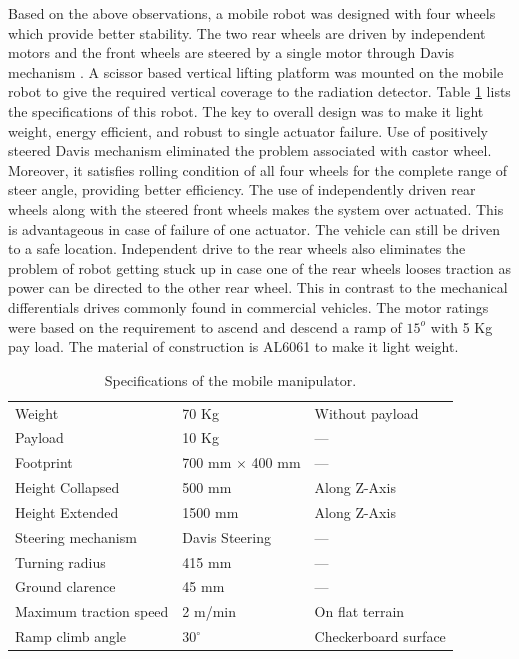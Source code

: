 \documentclass[12pt,a4paper, notitlepage]{article}
\begin{document}
	Based on the above observations, a mobile robot was designed with four wheels which provide better stability. The two rear wheels are driven by independent motors and the front wheels are steered by a single motor through Davis mechanism \cite{TOMBook}. A scissor based vertical lifting platform was mounted on the mobile robot to give the required vertical coverage to the radiation detector. Table \ref{tb:specifications} lists the  specifications of this robot. The key to overall design was to make it light weight, energy efficient, and robust to single actuator failure. Use of positively steered Davis mechanism eliminated the problem associated with castor wheel. Moreover, it satisfies rolling condition of all four wheels for the complete range of steer angle, providing better efficiency. The use of independently driven rear wheels along with the steered front  wheels makes the system over actuated. This is advantageous in case of failure of one actuator. The vehicle can still be driven to a safe location. Independent drive to the rear wheels also eliminates the problem of robot getting stuck up in case  one of the rear wheels looses traction as power can be directed to the other rear wheel. This in contrast to the mechanical differentials drives commonly found in commercial vehicles.  The motor ratings were based on the requirement to ascend and descend a ramp of $15^o$ with 5 Kg pay load. The material of construction is AL6061 to make it light weight.
	\begin{table}[!htbp]
		\caption{Specifications of the mobile manipulator.}
		\label{tb:specifications}
		\centering
		\begin{tabular}{l l l}
			\hline
			
			Weight  & 70 Kg & Without payload \\ 
			Payload & 10 Kg &---\\
			Footprint & 700 mm $\times$  400 mm & --- \\
			Height Collapsed & 500 mm  & Along  Z-Axis\\
			Height Extended & 1500 mm & Along  Z-Axis  \\
			Steering mechanism & Davis Steering & ---\\
			Turning radius & 415 mm & --- \\
			Ground clarence & 45 mm & ---\\
			Maximum traction speed & 2 m/min & On flat terrain \\
			Ramp climb angle & $30^\circ $ & Checkerboard surface\\
			\hline
		\end{tabular}
	\end{table}
	
\end{document}
